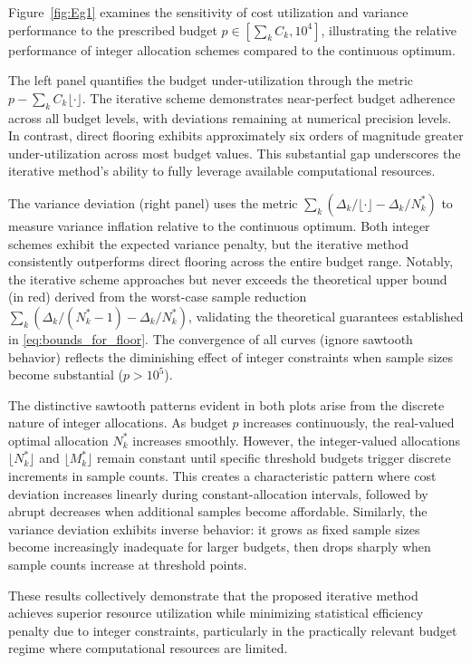 Figure~\ref{fig:Eg1} examines the sensitivity of cost utilization and variance performance to the prescribed budget $p \in [\sum_k C_k, 10^4]$, illustrating the relative performance of integer allocation schemes compared to the continuous optimum.

The left panel quantifies the budget under-utilization through the metric $p - \sum_k C_k \lfloor \cdot \rfloor$. The iterative scheme demonstrates near-perfect budget adherence across all budget levels, with deviations remaining at numerical precision levels. In contrast, direct flooring exhibits approximately six orders of magnitude greater under-utilization across most budget values. This substantial gap underscores the iterative method's ability to fully leverage available computational resources.



The variance deviation (right panel) uses the metric $\sum_k (\Delta_k/\lfloor \cdot \rfloor - \Delta_k/N_k^*)$ to measure variance inflation relative to the continuous optimum. Both integer schemes exhibit the expected variance penalty, but the iterative method consistently outperforms direct flooring across the entire budget range. Notably, the iterative scheme approaches but never exceeds the theoretical upper bound (in red) derived from the worst-case sample reduction $\sum_k (\Delta_k/(N_k^*-1) - \Delta_k/N_k^*)$, validating the theoretical guarantees established in \eqref{eq:bounds_for_floor}. The convergence of all curves (ignore sawtooth behavior) reflects the diminishing effect of integer constraints when sample sizes become substantial ($p > 10^5$).


The distinctive sawtooth patterns evident in both plots arise from the discrete nature of integer allocations. As budget $p$ increases continuously, the real-valued optimal allocation $N_k^*$ increases smoothly. However, the integer-valued allocations $\lfloor N_k^* \rfloor$ and $\lfloor M_k^* \rfloor$ remain constant until specific threshold budgets trigger discrete increments in sample counts. This creates a characteristic pattern where cost deviation increases linearly during constant-allocation intervals, followed by abrupt decreases when additional samples become affordable. Similarly, the variance deviation exhibits inverse behavior: it grows as fixed sample sizes become increasingly inadequate for larger budgets, then drops sharply when sample counts increase at threshold points.


These results collectively demonstrate that the proposed iterative method achieves superior resource utilization while minimizing statistical efficiency penalty due to integer constraints, particularly in the practically relevant budget regime where computational resources are limited.



